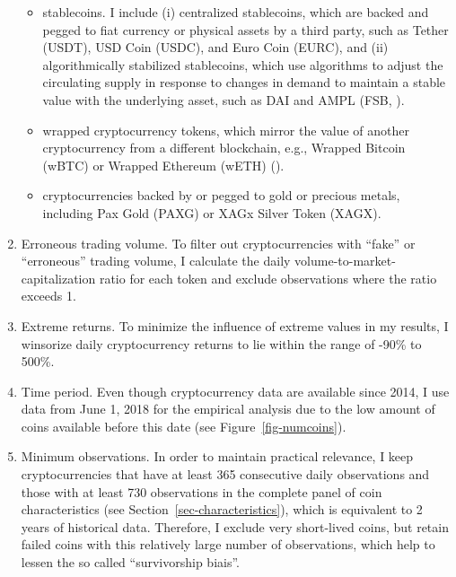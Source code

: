 \documentclass[
  12pt,
  a4paper,
  openany]{scrbook}
\begin{document}
\begin{enumerate}
  \begin{itemize}
  \item
    stablecoins. I include (i) centralized stablecoins, which are backed
    and pegged to fiat currency or physical assets by a third party,
    such as Tether (USDT), USD Coin (USDC), and Euro Coin (EURC), and
    (ii) algorithmically stabilized stablecoins, which use algorithms to
    adjust the circulating supply in response to changes in demand to
    maintain a stable value with the underlying asset, such as DAI and
    AMPL (FSB,
    ).
  \item
    wrapped cryptocurrency tokens, which mirror the value of another
    cryptocurrency from a different blockchain, e.g., Wrapped Bitcoin
    (wBTC) or Wrapped Ethereum (wETH)
    ().
  \item
    cryptocurrencies backed by or pegged to gold or precious metals,
    including Pax Gold (PAXG) or XAGx Silver Token (XAGX).
  \end{itemize}
\item
  Erroneous trading volume. To filter out cryptocurrencies with ``fake''
  or ``erroneous'' trading volume, I calculate the daily
  volume-to-market-capitalization ratio for each token and exclude
  observations where the ratio exceeds 1.
\item
  Extreme returns. To minimize the influence of extreme values in my
  results, I winsorize daily cryptocurrency returns to lie within the
  range of -90\% to 500\%.
\item
  Time period. Even though cryptocurrency data are available since 2014,
  I use data from June 1, 2018 for the empirical analysis due to the low
  amount of coins available before this date (see
  Figure~\ref{fig-numcoins}).
\item
  Minimum observations. In order to maintain practical relevance, I keep
  cryptocurrencies that have at least 365 consecutive daily observations
  and those with at least 730 observations in the complete panel of coin
  characteristics (see Section~\ref{sec-characteristics}), which is
  equivalent to 2 years of historical data. Therefore, I exclude very
  short-lived coins, but retain failed coins with this relatively large
  number of observations, which help to lessen the so called
  ``survivorship biais''.
\end{enumerate}
\end{document}
